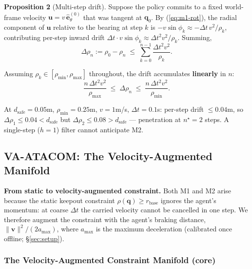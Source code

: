 \documentclass[letterpaper]{article}
\begin{document}
\textbf{Proposition 2} (Multi-step drift). Suppose the policy commits to a fixed world-frame velocity $\boldsymbol{u} = v\,\hat{\boldsymbol{e}}_\theta^{(0)}$ that was tangent at $\boldsymbol{q}_0$. By (\ref{eq:m1-rot}), the radial component of $\boldsymbol{u}$ relative to the bearing at step $k$ is $-v\sin\phi_k \approx -\Delta t\,v^2/\rho_k$, contributing per-step inward drift $\Delta t \cdot v\sin\phi_k \approx \Delta t^2 v^2/\rho_k$. Summing,
\begin{equation}
\Delta\rho_n := \rho_0 - \rho_n \;\le\; \sum_{k=0}^{n-1} \frac{\Delta t^2 v^2}{\rho_k}.
\label{eq:m2}
\end{equation}

Assuming $\rho_k \in [\rho_{\min}, \rho_{\max}]$ throughout, the drift accumulates \textbf{linearly} in $n$:
\begin{equation}
\frac{n\,\Delta t^2 v^2}{\rho_{\max}} \;\le\; \Delta\rho_n \;\le\; \frac{n\,\Delta t^2 v^2}{\rho_{\min}}.
\end{equation}

At $d_\text{safe} = 0.05$m, $\rho_{\min} = 0.25$m, $v = 1$m/s, $\Delta t = 0.1$s: per-step drift $\le 0.04$m, so $\Delta\rho_1 \le 0.04 < d_\text{safe}$ but $\Delta\rho_2 \le 0.08 > d_\text{safe}$ — penetration at $n^\star = 2$ steps. A single-step ($h{=}1$) filter cannot anticipate M2.

\subsection{VA-ATACOM: The Velocity-Augmented Manifold}
\label{sec:design}

\textbf{From static to velocity-augmented constraint.} Both M1 and M2 arise because the static keepout constraint $\rho(\boldsymbol{q}) \ge r_\text{base}$ ignores the agent's momentum: at coarse $\Delta t$ the carried velocity cannot be cancelled in one step. We therefore augment the constraint with the agent's braking distance, $\|\boldsymbol{v}\|^2/(2a_{\max})$, where $a_{\max}$ is the maximum deceleration (calibrated once offline; \S\ref{sec:setup}).

\subsubsection{The Velocity-Augmented Constraint Manifold (core)}
\end{document}
